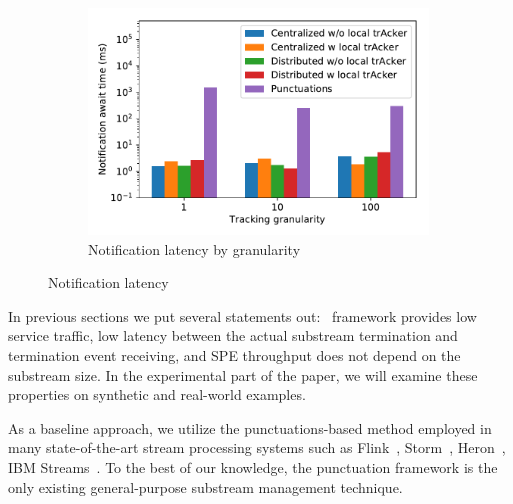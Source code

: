 \begin{figure}[t!]
\begin{subfigure}[b]{0.3\textwidth}
            \includegraphics[width=0.99\textwidth]{pics/notification_await_time_by_tracking_frequency_bars.pdf}
            \caption{Notification latency by granularity}
            \label{notification_granularity}
    \end{subfigure}
    \caption{Notification latency}
    \label{notification_latency}
\end{figure}


In previous sections we put several statements out: \tracker\ framework provides low service traffic, low latency between the actual substream termination and termination event receiving, and SPE throughput does not depend on the substream size. In the experimental part of the paper, we will examine these properties on synthetic and real-world examples. 

As a baseline approach, we utilize the punctuations-based method employed in many state-of-the-art stream processing systems such as Flink~\cite{Carbone:2017:SMA:3137765.3137777}, Storm~\cite{apache:storm:state}, Heron~\cite{Kulkarni:2015:THS:2723372.2742788}, IBM Streams~\cite{jacques2016consistent}. To the best of our knowledge, the punctuation framework is the only existing general-purpose substream management technique.



